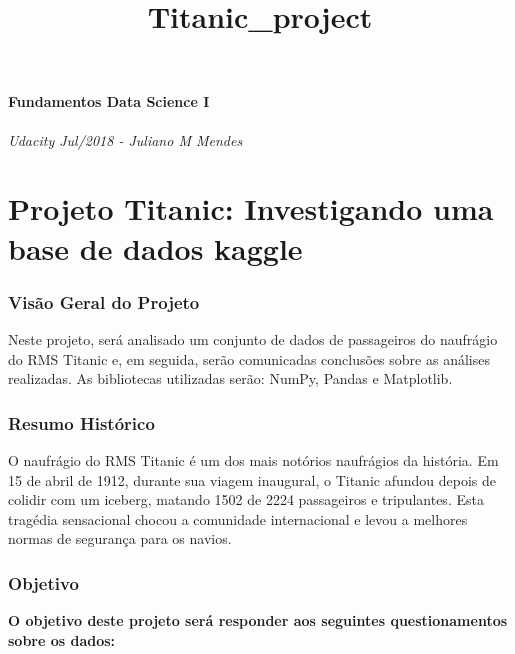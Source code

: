 \documentclass[11pt]{article}
\title{Titanic\_project}
\begin{document}
    
    
    \maketitle
    
    

    
    \paragraph{Fundamentos Data Science I}\label{fundamentos-data-science-i}

\emph{Udacity Jul/2018 - Juliano M Mendes}

\section{Projeto Titanic: Investigando uma base de dados
kaggle}\label{projeto-titanic-investigando-uma-base-de-dados-kaggle}

\subsubsection{Visão Geral do Projeto}\label{visuxe3o-geral-do-projeto}

Neste projeto, será analisado um conjunto de dados de passageiros do
naufrágio do RMS Titanic e, em seguida, serão comunicadas conclusões
sobre as análises realizadas. As bibliotecas utilizadas serão: NumPy,
Pandas e Matplotlib.

\subsubsection{Resumo Histórico}\label{resumo-histuxf3rico}

O naufrágio do RMS Titanic é um dos mais notórios naufrágios da
história. Em 15 de abril de 1912, durante sua viagem inaugural, o
Titanic afundou depois de colidir com um iceberg, matando 1502 de 2224
passageiros e tripulantes. Esta tragédia sensacional chocou a comunidade
internacional e levou a melhores normas de segurança para os navios.

\subsubsection{Objetivo}\label{objetivo}

\textbf{O objetivo deste projeto será responder aos seguintes
questionamentos sobre os dados:}
\end{document}
